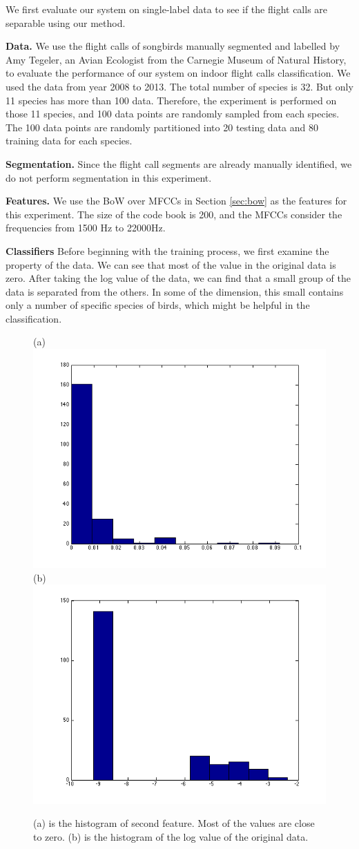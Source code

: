 \documentclass{article} %
\begin{document}
We first evaluate our system on single-label data to see if the flight calls are separable using our method.

\textbf{Data.} 
We use the flight calls of songbirds manually segmented and labelled by Amy Tegeler, an Avian Ecologist from the Carnegie Museum of Natural History, to evaluate the performance of our system on indoor flight calls classification. We used the data from year 2008 to 2013. The total number of species is 32. But only 11 species has more than 100 data. Therefore, the experiment is performed on those 11 species, and 100 data points are randomly sampled from each species. The 100 data points are randomly partitioned into 20 testing data and 80 training data for each species.


\textbf{Segmentation.}
Since the flight call segments are already manually identified, we do not perform segmentation in this experiment.

\textbf{Features.}
We use the BoW over MFCCs in Section \ref{sec:bow} as the features for this experiment. The size of the code book is 200, and the MFCCs consider the frequencies from 1500 Hz to 22000Hz.

\textbf{Classifiers}
Before beginning with the training process, we first examine the property of the data. We can see that most of the value in the original data is zero. After taking the log value of the data, we can find that a small group of the data is separated from the others. In some of the dimension, this small contains only a number of specific species of birds, which might be helpful in the classification.
\begin{figure}[ht!]
    \centering
    {(a)\includegraphics[width=0.45\linewidth]{../Figure/Train_features}
    (b)\includegraphics[width=0.45\linewidth]{../Figure/Train_features_log}}
    \caption{(a) is the histogram of second feature. Most of the values are close to zero. (b) is the histogram of the log value of the original data.}
    \label{fig:hist}
\end{figure}
\end{document}
